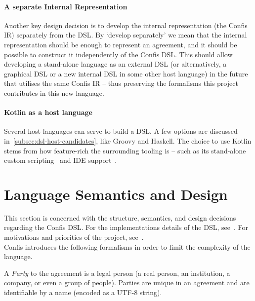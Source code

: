 \paragraph{A separate Internal Representation}
Another key design decision is to develop the internal representation (the Confis IR) separately from the DSL\@.
By `develop separately' we mean that the internal representation should be enough to represent an agreement, and it should be possible to construct it independently of the Confis DSL\@.
This should allow developing a stand-alone language as an external DSL (or alternatively, a graphical DSL or a new internal DSL in some other host language) in the future that utilises the same Confis IR -- thus preserving the formalisms this project contributes in this new language.

\paragraph{Kotlin as a host language} Several host languages can serve to build a DSL.
A few options are discussed in~\autoref{subsec:dsl-host-candidates}, like Groovy and Haskell.
The choice to use Kotlin stems from how feature-rich the surrounding tooling is -- such as its stand-alone custom scripting~\cite{kotlinScriptKeep} and IDE support~\cite{intelliJRepo}.\\


\section{Language Semantics and Design}\label{sec:language-semantics}

This section is concerned with the structure, semantics, and design decisions regarding the Confis DSL.
For the implementations details of the DSL, see~.
For motivations and priorities of the project, see~.\\


Confis introduces the following formalisms in order to limit the complexity of the language.

\begin{definition}[Party]
    \label{def:party}

    A \emph{Party} to the agreement is a legal person (a real person, an institution, a company, or even a group of people).
    Parties are unique in an agreement and are identifiable by a name (encoded as a UTF-8 string).
\end{definition}

